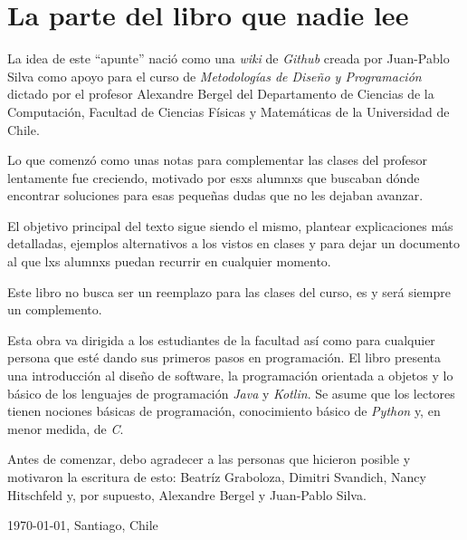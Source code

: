 \chapter*{La parte del libro que nadie lee}
  La idea de este \enquote{apunte} nació como una \textit{wiki} de \textit{Github} creada por 
  Juan-Pablo Silva como apoyo para el curso de \textit{Metodologías de Diseño y Programación} 
  dictado por el profesor Alexandre Bergel del Departamento de Ciencias de la Computación, Facultad
  de Ciencias Físicas y Matemáticas de la Universidad de Chile.

  Lo que comenzó como unas notas para complementar las clases del profesor lentamente fue creciendo,
  motivado por esxs alumnxs que buscaban dónde encontrar soluciones para esas pequeñas dudas que no
  les dejaban avanzar.

  El objetivo principal del texto sigue siendo el mismo, plantear explicaciones más detalladas, 
  ejemplos alternativos a los vistos en clases y para dejar un documento al que lxs alumnxs puedan
  recurrir en cualquier momento.

  Este libro no busca ser un reemplazo para las clases del curso, es y será siempre un complemento.

  Esta obra va dirigida a los estudiantes de la facultad así como para cualquier persona que esté
  dando sus primeros pasos en programación.
  El libro presenta una introducción al diseño de software, la programación orientada a objetos y lo
  básico de los lenguajes de programación \textit{Java} y \textit{Kotlin}.
  Se asume que los lectores tienen nociones básicas de programación, conocimiento básico de 
  \textit{Python} y, en menor medida, de \textit{C}.

  Antes de comenzar, debo agradecer a las personas que hicieron posible y motivaron la escritura de
  esto: Beatríz Graboloza, Dimitri Svandich, Nancy Hitschfeld y, por supuesto, Alexandre Bergel y 
  Juan-Pablo Silva.

  \begin{center}
    \today, Santiago, Chile
  \end{center}